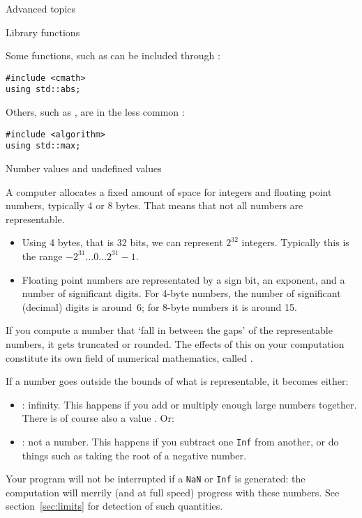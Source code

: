  {Advanced topics}

 {Library functions}

Some functions, such as  can be included through :
\begin{lstlisting}
#include <cmath>
using std::abs;
\end{lstlisting}
Others, such as , are in the less common :
\begin{lstlisting}
#include <algorithm>
using std::max;
\end{lstlisting}

 {Number values and undefined values}
\label{sec:naninf}

A computer allocates a fixed amount of space for integers and floating
point numbers, typically 4 or 8 bytes. That means that not all numbers
are representable.
\begin{itemize}
\item Using 4 bytes, that is 32 bits, we can represent $2^{32}$
  integers. Typically this is the range $-2^{31}\ldots 0 \ldots
  2^{31}-1$.
\item Floating point numbers are representated by a sign bit, an
  exponent, and a number of significant digits.
  For 4-byte numbers, the number of significant (decimal) digits is
  around~6; for 8-byte numbers it is around 15.
\end{itemize}

If you compute a number that `fall in between the gaps' of the
representable numbers, it gets truncated or rounded. The effects of
this on your computation constitute its own field of numerical
mathematics, called .

If a number goes outside the bounds of what is representable, it
becomes either:
\begin{itemize}
\item {}: infinity. This happens if you add or multiply
  enough large numbers together. There is of course also a value
  \n{-}. Or:
\item {}: not a number. This happens if you subtract
  one \lstinline{Inf} from another, or do things such as taking the
  root of a negative number.
\end{itemize}
Your program will not be interrupted if a \lstinline{NaN} or \lstinline{Inf} is
generated: the computation will merrily (and at full speed) progress
with these numbers. See section~\ref{sec:limits} for detection of such quantities.

